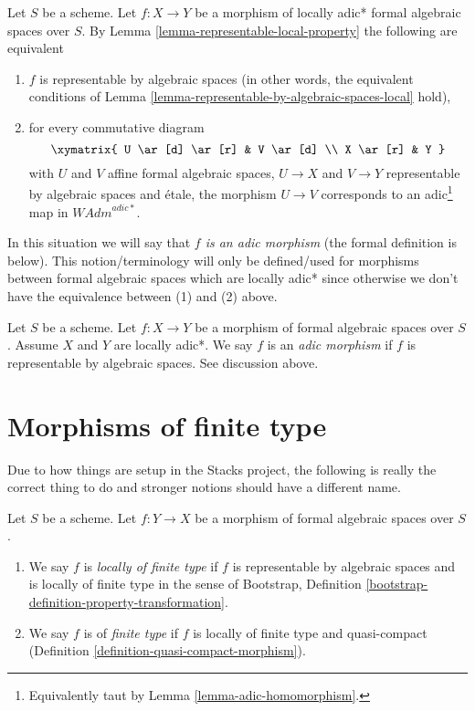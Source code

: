\noindent
Let $S$ be a scheme. Let $f : X \to Y$ be a morphism of
locally adic* formal algebraic spaces over $S$.
By Lemma \ref{lemma-representable-local-property}
the following are equivalent
\begin{enumerate}
\item $f$ is representable by algebraic spaces (in other words, the
equivalent conditions of
Lemma \ref{lemma-representable-by-algebraic-spaces-local} hold),
\item for every commutative diagram
$$
\xymatrix{
U \ar[d] \ar[r] & V \ar[d] \\
X \ar[r] & Y
}
$$
with $U$ and $V$ affine formal algebraic spaces, $U \to X$ and $V \to Y$
representable by algebraic spaces and \'etale, the morphism $U \to V$
corresponds to an adic\footnote{Equivalently taut by
Lemma \ref{lemma-adic-homomorphism}.} map in $\textit{WAdm}^{adic*}$.
\end{enumerate}
In this situation we will say that {\it $f$ is an adic morphism} (the formal
definition is below). This notion/terminology will only be defined/used
for morphisms between formal algebraic spaces which are locally adic*
since otherwise we don't have the equivalence between (1) and (2) above.

\begin{definition}
\label{definition-adic-morphism}
Let $S$ be a scheme. Let $f : X \to Y$ be a morphism of formal algebraic
spaces over $S$. Assume $X$ and $Y$ are locally adic*. We say $f$ is
an {\it adic morphism} if $f$ is representable by algebraic spaces.
See discussion above.
\end{definition}











\section{Morphisms of finite type}
\label{section-finite-type}

\noindent
Due to how things are setup in the Stacks project, the following
is really the correct thing to do and stronger notions should have
a different name.

\begin{definition}
\label{definition-finite-type}
Let $S$ be a scheme. Let $f : Y \to X$ be a morphism of formal algebraic
spaces over $S$.
\begin{enumerate}
\item We say $f$ is {\it locally of finite type}
if $f$ is representable by algebraic spaces and is locally
of finite type in the sense of
Bootstrap, Definition \ref{bootstrap-definition-property-transformation}.
\item We say $f$ is of {\it finite type} if $f$ is locally of finite type and
quasi-compact (Definition \ref{definition-quasi-compact-morphism}).
\end{enumerate}
\end{definition}

